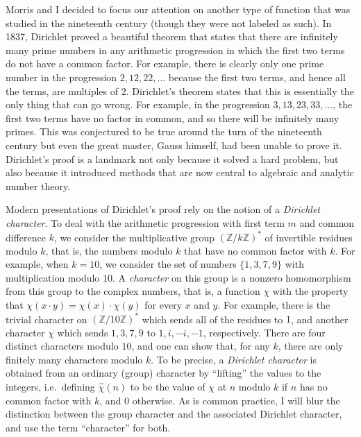 \documentclass[12pt]{article}
\newcommand{\ZZ}{\mathbb{Z}}
\begin{document}
Morris and I decided to focus our attention on another type of function that was studied in the nineteenth century (though they were not labeled as such). In 1837, Dirichlet proved a beautiful theorem that states that there are infinitely many prime numbers in any arithmetic progression in which the first two terms do not have a common factor. For example, there is clearly only one prime number in the progression $2, 12, 22, \ldots$ because the first two terms, and hence all the terms, are multiples of $2$. Dirichlet's theorem states that this is essentially the only thing that can go wrong. For example, in the progression $3, 13, 23, 33, \ldots$, the first two terms have no factor in common, and so there will be infinitely many primes. This was conjectured to be true around the turn of the nineteenth century but even the great master, Gauss himself, had been unable to prove it. Dirichlet's proof is a landmark not only because it solved a hard problem, but also because it introduced methods that are now central to algebraic and analytic number theory.

Modern presentations of Dirichlet's proof rely on the notion of a \emph{Dirichlet character}. To deal with the arithmetic progression with first term $m$ and common difference $k$, we consider the multiplicative group $(\ZZ/k\ZZ)^*$ of invertible residues modulo $k$, that is, the numbers modulo $k$ that have no common factor with $k$. For example, when $k = 10$, we consider the set of numbers $\{1, 3, 7, 9\}$ with multiplication modulo $10$. A \emph{character} on this group is a nonzero homomorphism from this group to the complex numbers, that is, a function $\chi$ with the property that $\chi(x \cdot y) = \chi(x) \cdot \chi(y)$ for every $x$ and $y$. For example, there is the trivial character on $(\ZZ/10\ZZ)^*$ which sends all of the residues to $1$, and another character $\chi$ which sends $1, 3, 7, 9$ to $1, i, -i, -1$, respectively. There are four distinct characters modulo $10$, and one can show that, for any $k$, there are only finitely many characters modulo $k$. To be precise, a \emph{Dirichlet character} is obtained from an ordinary (group) character by ``lifting'' the values to the integers, i.e.~defining $\hat \chi(n)$ to be the value of $\chi$ at $n$ modulo $k$ if $n$ has no common factor with $k$, and $0$ otherwise. As is common practice, I will blur the distinction between the group character and the associated Dirichlet character, and use the term ``character'' for both.
\end{document}
